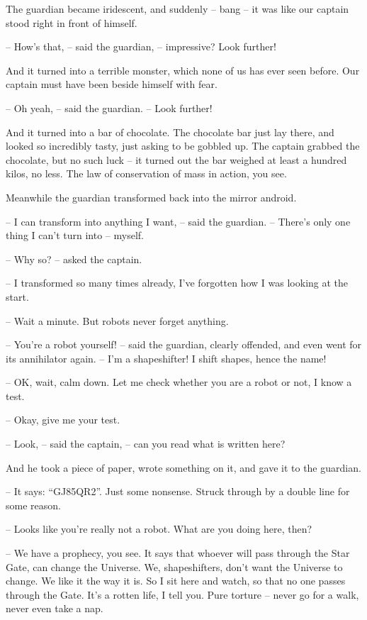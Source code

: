\documentclass[ebook,oneside,final,openright]{memoir}
\begin{document}
The guardian became iridescent, and suddenly – bang – it was like our captain stood right in front of himself.\par
– How’s that, – said the guardian, – impressive? Look further!\par
And it turned into a terrible monster, which none of us has ever seen before. Our captain must have been beside himself with fear.\par
– Oh yeah, – said the guardian. – Look further!\par
\par
And it turned into a bar of chocolate. The chocolate bar just lay there, and looked so incredibly tasty, just asking to be gobbled up. The captain grabbed the chocolate, but no such luck – it turned out the bar weighed at least a hundred kilos, no less. The law of conservation of mass in action, you see.\par
\par
Meanwhile the guardian transformed back into the mirror android.\par
– I can transform into anything I want, – said the guardian. – There’s only one thing I can’t turn into – myself.\par
– Why so? – asked the captain.\par
– I transformed so many times already, I’ve forgotten how I was looking at the start.\par
– Wait a minute. But robots never forget anything.\par
– You’re a robot yourself! – said the guardian, clearly offended, and even went for its annihilator again. – I’m a shapeshifter! I shift shapes, hence the name!\par
– OK, wait, calm down. Let me check whether you are a robot or not, I know a test.\par
– Okay, give me your test.\par
– Look, – said the captain, – can you read what is written here?\par
And he took a piece of paper, wrote something on it, and gave it to the guardian.\par
– It says: “GJ85QR2”. Just some nonsense. Struck through by a double line for some reason.\par
– Looks like you’re really not a robot. What are you doing here, then?\par
– We have a prophecy, you see. It says that whoever will pass through the Star Gate, can change the Universe. We, shapeshifters, don’t want the Universe to change. We like it the way it is. So I sit here and watch, so that no one passes through the Gate. It’s a rotten life, I tell you. Pure torture – never go for a walk, never even take a nap.\par
\end{document}
